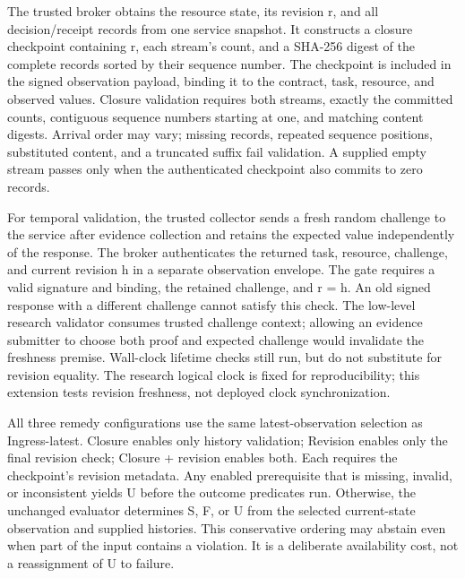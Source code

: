 \documentclass[11pt]{article}
\begin{document}
The trusted broker obtains the resource state, its revision r, and all decision/receipt records from one service snapshot. It constructs a closure checkpoint containing r, each stream's count, and a SHA-256 digest of the complete records sorted by their sequence number. The checkpoint is included in the signed observation payload, binding it to the contract, task, resource, and observed values. Closure validation requires both streams, exactly the committed counts, contiguous sequence numbers starting at one, and matching content digests. Arrival order may vary; missing records, repeated sequence positions, substituted content, and a truncated suffix fail validation. A supplied empty stream passes only when the authenticated checkpoint also commits to zero records.

For temporal validation, the trusted collector sends a fresh random challenge to the service after evidence collection and retains the expected value independently of the response. The broker authenticates the returned task, resource, challenge, and current revision h in a separate observation envelope. The gate requires a valid signature and binding, the retained challenge, and r = h. An old signed response with a different challenge cannot satisfy this check. The low-level research validator consumes trusted challenge context; allowing an evidence submitter to choose both proof and expected challenge would invalidate the freshness premise. Wall-clock lifetime checks still run, but do not substitute for revision equality. The research logical clock is fixed for reproducibility; this extension tests revision freshness, not deployed clock synchronization.

All three remedy configurations use the same latest-observation selection as Ingress-latest. Closure enables only history validation; Revision enables only the final revision check; Closure + revision enables both. Each requires the checkpoint's revision metadata. Any enabled prerequisite that is missing, invalid, or inconsistent yields U before the outcome predicates run. Otherwise, the unchanged evaluator determines S, F, or U from the selected current-state observation and supplied histories. This conservative ordering may abstain even when part of the input contains a violation. It is a deliberate availability cost, not a reassignment of U to failure.
\end{document}
